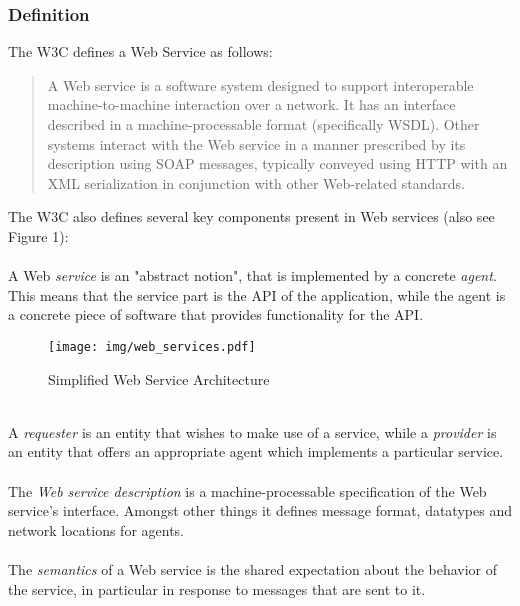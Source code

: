 \subsubsection*{Definition}
The W3C defines a Web Service as follows: 
\begin{quote}
A Web service is a software system designed to support interoperable machine-to-machine interaction over a network. It has an interface described in a machine-processable format (specifically WSDL). Other systems interact with the Web service in a manner prescribed by its description using SOAP messages, typically conveyed using HTTP with an XML serialization in conjunction with other Web-related standards. \cite{WSARCH}
\end{quote}
The W3C also defines several key components present in Web services (also see Figure 1):
\\ \\
A Web \emph{service} is an "abstract notion", that is implemented by a concrete \emph{agent}. This means that the service part is the API of the application, while the agent is a concrete piece of software that provides functionality for the API. 
\begin{figure}[htp]
\centering
\texttt{[image: img/web\_services.pdf]}
\caption{Simplified Web Service Architecture}\label{fig:erptsqfit}
\end{figure}
\\
A \emph{requester} is an entity that wishes to make use of a service, while a \emph{provider} is an entity that offers an appropriate agent which implements a particular service. 
\\ \\
The \emph{Web service description} is a machine-processable specification of the Web service's interface. Amongst other things it defines message format, datatypes and network locations for agents. 
\\ \\
The \emph{semantics} of a Web service is the shared expectation about the behavior of the service, in particular in response to messages that are sent to it. \cite{WSARCH}


